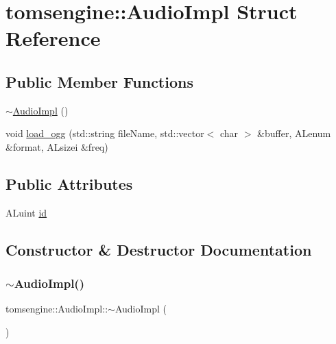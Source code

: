 \hypertarget{structtomsengine_1_1_audio_impl}{}\section{tomsengine\+:\+:Audio\+Impl Struct Reference}
\label{structtomsengine_1_1_audio_impl}
\subsection*{Public Member Functions}
\begin{DoxyCompactItemize}
\item 
\mbox{\hyperlink{structtomsengine_1_1_audio_impl_afb9781a409e9c2b04a8c5ded0417e3f5}{$\sim$\+Audio\+Impl}} ()
\item 
void \mbox{\hyperlink{structtomsengine_1_1_audio_impl_a95a18a49f4741b70d83adfde334be19a}{load\+\_\+ogg}} (std\+::string file\+Name, std\+::vector$<$ char $>$ \&buffer, A\+Lenum \&format, A\+Lsizei \&freq)
\end{DoxyCompactItemize}
\subsection*{Public Attributes}
\begin{DoxyCompactItemize}
\item 
A\+Luint \mbox{\hyperlink{structtomsengine_1_1_audio_impl_a24617361b934b7429242f1eb24692b09}{id}}
\end{DoxyCompactItemize}


\subsection{Constructor \& Destructor Documentation}
\mbox{\label{structtomsengine_1_1_audio_impl_afb9781a409e9c2b04a8c5ded0417e3f5}} 
\subsubsection{\texorpdfstring{$\sim$\+Audio\+Impl()}{~AudioImpl()}}
{\footnotesize\ttfamily tomsengine\+::\+Audio\+Impl\+::$\sim$\+Audio\+Impl (\begin{DoxyParamCaption}{ }\end{DoxyParamCaption})\hspace{0.3cm}{\ttfamily [inline]}}



